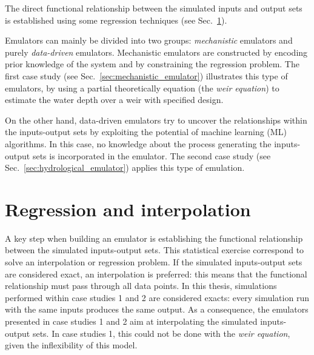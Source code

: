 The direct functional relationship between the simulated inputs and output sets is established using some regression techniques (see Sec.~\ref{sec:regression_interpolation}).

Emulators can mainly be divided into two groups: \emph{mechanistic} emulators and purely \emph{data-driven} emulators.
Mechanistic emulators are constructed by encoding prior knowledge of the system and by constraining the regression problem. The first case study (see Sec.~\ref{sec:mechanistic_emulator}) illustrates this type of emulators, by using a partial theoretically equation (the \textit{weir equation}) to estimate the water depth over a weir with specified design.

On the other hand, data-driven emulators try to uncover the relationships within the inputs-output sets by exploiting the potential of machine learning (ML) algorithms. In this case, no knowledge about the process generating the inputs-output sets is incorporated in the emulator. The second case study (see Sec.~\ref{sec:hydrological_emulator}) applies this type of emulation. 


\section{Regression and interpolation}\label{sec:regression_interpolation}

A key step when building an emulator is establishing the functional relationship between the simulated inputs-output sets. This statistical exercise correspond to solve an interpolation or regression problem.
If the simulated inputs-output sets are considered exact, an interpolation is preferred: this means that the functional relationship must pass through all data points. In this thesis, simulations performed within case studies 1 and 2 are considered exacts: every simulation run with the same inputs produces the same output.
As a consequence, the emulators presented in case studies 1 and 2 aim at interpolating the simulated inputs-output sets.
In case studies 1, this could not be done with the \textit{weir equation}, given the inflexibility of this model.\\

